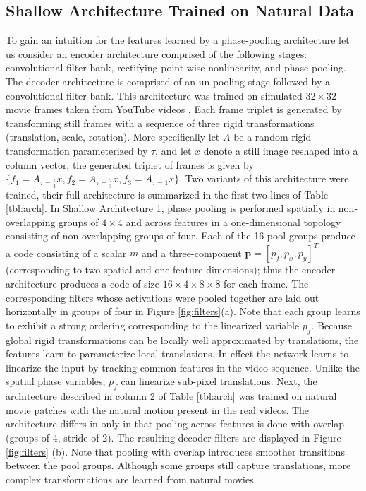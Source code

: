 \subsection{Shallow Architecture Trained on Natural Data}
To gain an intuition for the features learned by a phase-pooling architecture let us consider an encoder architecture comprised of the following stages: convolutional filter bank,   rectifying point-wise nonlinearity, and phase-pooling. The decoder architecture is comprised of an un-pooling stage followed by a convolutional filter bank. This architecture was trained on simulated $32 \times 32$ movie frames taken from YouTube videos \cite{slowAE}. Each frame triplet is generated by transforming still frames with a sequence of three rigid transformations (translation, scale, rotation). More specifically let $A$ be a random rigid transformation parameterized by $\tau$, and let $x$ denote a still image reshaped into a column vector, the generated triplet of frames is given by $\{f_1=A_{\tau=\frac{1}{3}}x,f_2=A_{\tau=\frac{2}{3}}x,f_3=A_{\tau=1}x\}$. Two variants of this architecture were trained, their full architecture is summarized in the first two lines of Table \ref{tbl:arch}. In Shallow Architecture 1, phase pooling is performed spatially in non-overlapping groups of $4\times4$ and across features in a one-dimensional topology consisting of non-overlapping groups of four. Each of the 16 pool-groups produce a code consisting of a scalar $m$ and a three-component $\mathbf p = [p_f,p_x,p_y]^T$ (corresponding to two spatial and one feature dimensions); thus the encoder architecture produces a code of size $16 \times 4 \times 8 \times 8$ for each frame. The corresponding filters whose activations were pooled together are laid out horizontally in groups of four in Figure \ref{fig:filters}(a). Note that each group learns to exhibit a strong ordering corresponding to the linearized variable $p_f$. Because global rigid transformations can be locally well approximated by translations, the features learn to parameterize local translations. In effect the network learns to linearize the input by tracking common features in the video sequence. Unlike the spatial phase variables, $p_f$ can linearize sub-pixel translations. Next, the architecture described in column 2 of Table \ref{tbl:arch} was trained on natural movie patches with the natural motion present in the real videos. The architecture differs in only in that pooling across features is done with overlap (groups of 4, stride of 2). The resulting decoder filters are displayed in Figure \ref{fig:filters} (b). Note that pooling with overlap introduces smoother transitions between the pool groups. Although some groups still capture translations, more complex transformations are learned from natural movies. 

